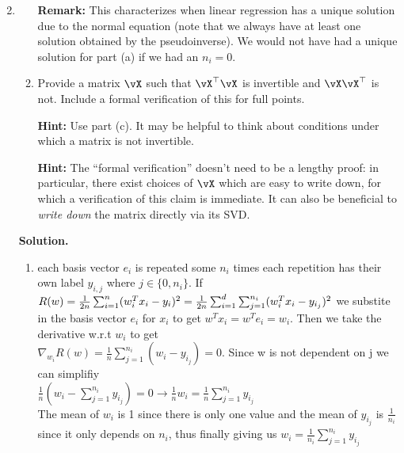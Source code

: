 \documentclass{article}
\theoremstyle{definition}
\theoremstyle{remark}
\newenvironment{Q}
{%
  \clearpage
  \item
  }
  {%
    \phantom{s} %
    \bigskip
    \textbf{Solution.}
  }
\begin{document}
\begin{enumerate}[font={\Large\bfseries},left=0pt]
\begin{Q}
\begin{enumerate}
    \textbf{Remark:} This characterizes when linear regression has a unique solution due to the normal equation (note that we always have at least one solution obtained by the pseudoinverse). We would not have had a unique solution for part (a) if we had an $n_i = 0$.
    
    \item Provide a matrix $\vX$ such that $\vX^\top \vX$ is invertible and $\vX\vX^\top$ is not. Include a formal verification of this for full points.
    
    \textbf{Hint:} Use part (c). It may be helpful to think about conditions under which a matrix is not invertible.

    \textbf{Hint:}
    The ``formal verification'' doesn't need to be a lengthy proof: in particular, there exist choices of $\vX$ which are easy to write down,
    for which a verification of this claim is immediate.  It can also be beneficial to \emph{write down} the matrix directly via its SVD.
    
  \end{enumerate}
  \end{Q}
  \begin{enumerate}
    \item each basis vector $e_{i}$ is repeated some $n_{i}$ times each repetition has their own label $y_{i,j}$ where $j \in \{0,n_{i}\}$.
    If $R(w) = \frac{1}{2n} \sum_{i=1}^{n} (w^{T}_{i}x_{i}-y_{i})^{2} 
    = \frac{1}{2n} \sum_{i=1}^{d} \sum^{n_{i}}_{j=1} (w^{T}_{i}x_{i}-y_{i_{j}})^{2}\\$ we substite in the basis vector $e_i$ for $x_i$ to get
    $w^Tx_i = w^T e_i = w_i$. Then we take the derivative w.r.t $w_i$ to get\\
    $\nabla_{w_{i}} R(w) = \frac{1}{n} \sum_{j=1}^{n_{i}} (w_i-y_{i_j})=0$. Since w is not dependent on j we can simplifiy\\ 
    $\frac{1}{n}(w_i - \sum_{j=1}^{n_i} y_{i_j}) = 0 \rightarrow \frac{1}{n} w_i = \frac{1}{n} \sum_{j=1}^{n_i} y_{i_j}$\\
    The mean of $w_i$ is 1 since there is only one value and the mean of $y_{i_j}$ is $\frac{1}{n_i}$ since it only depends on $n_i$, 
    thus finally giving us $w_i = \frac{1}{n_i} \sum_{j=1}^{n_i} y_{i_j}$


\end{enumerate}
\end{enumerate}
\end{document}
